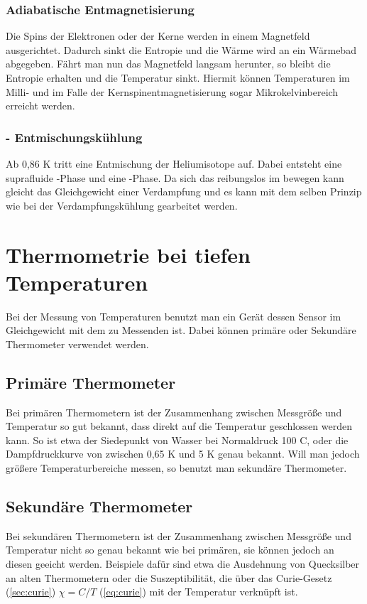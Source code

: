 \documentclass[twoside,colorback,accentcolor=tud4c,11pt]{tudreport}
\begin{document}
\subsubsection{Adiabatische Entmagnetisierung}
Die Spins der Elektronen oder der Kerne werden in einem Magnetfeld ausgerichtet. Dadurch sinkt die Entropie und die Wärme wird an ein Wärmebad abgegeben. Fährt man nun das Magnetfeld langsam herunter, so bleibt die Entropie erhalten und die Temperatur sinkt. Hiermit können Temperaturen im Milli- und im Falle der Kernspinentmagnetisierung sogar Mikrokelvinbereich erreicht werden.
\subsubsection{- Entmischungskühlung}
Ab 0,86 K tritt eine Entmischung der Heliumisotope auf. Dabei entsteht eine suprafluide -Phase und eine -Phase. Da sich das  reibungslos im  bewegen kann gleicht das Gleichgewicht einer Verdampfung und es kann mit dem selben Prinzip wie bei der Verdampfungskühlung gearbeitet werden.
\section{Thermometrie bei tiefen Temperaturen}
Bei der Messung von Temperaturen benutzt man ein Gerät dessen Sensor im Gleichgewicht mit dem zu Messenden ist. Dabei können primäre oder Sekundäre Thermometer verwendet werden.
\subsection{Primäre Thermometer}
Bei primären Thermometern ist der Zusammenhang zwischen Messgröße und Temperatur so gut bekannt, dass direkt auf die Temperatur geschlossen werden kann. So ist etwa der Siedepunkt von Wasser bei Normaldruck 100 \degree C, oder die Dampfdruckkurve von  zwischen 0,65 K und 5 K genau bekannt. Will man jedoch größere Temperaturbereiche messen, so benutzt man sekundäre Thermometer.
\subsection{Sekundäre Thermometer}
Bei sekundären Thermometern ist der Zusammenhang zwischen Messgröße und Temperatur nicht so genau bekannt wie bei primären, sie können jedoch an diesen geeicht werden. Beispiele dafür sind etwa die Ausdehnung von Quecksilber an alten Thermometern oder die Suszeptibilität, die über das Curie-Gesetz (\ref{sec:curie}) $ {\chi=C/T} $ (\ref{eq:curie}) mit der Temperatur verknüpft ist.
\end{document}
